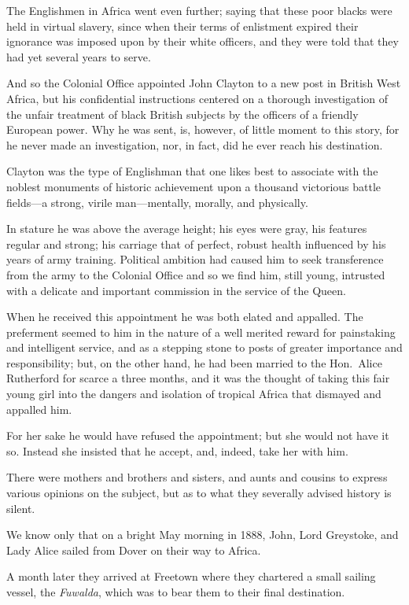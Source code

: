 The Englishmen in Africa went even further; saying that these poor blacks were held in virtual slavery, since when their terms of enlistment expired their ignorance was imposed upon by their white officers, and they were told that they had yet several years to serve.

And so the Colonial Office appointed John Clayton to a new post in British West Africa, but his confidential instructions centered on a thorough investigation of the unfair treatment of black British subjects by the officers of a friendly European power. Why he was sent, is, however, of little moment to this story, for he never made an investigation, nor, in fact, did he ever reach his destination.

Clayton was the type of Englishman that one likes best to associate with the noblest monuments of historic achievement upon a thousand victorious battle fields—a strong, virile man—mentally, morally, and physically.

In stature he was above the average height; his eyes were gray, his features regular and strong; his carriage that of perfect, robust health influenced by his years of army training. Political ambition had caused him to seek transference from the army to the Colonial Office and so we find him, still young, intrusted with a delicate and important commission in the service of the Queen.

When he received this appointment he was both elated and appalled. The preferment seemed to him in the nature of a well merited reward for painstaking and intelligent service, and as a stepping stone to posts of greater importance and responsibility; but, on the other hand, he had been married to the Hon.\ Alice Rutherford for scarce a three months, and it was the thought of taking this fair young girl into the dangers and isolation of tropical Africa that dismayed and appalled him.

For her sake he would have refused the appointment; but she would not have it so. Instead she insisted that he accept, and, indeed, take her with him.

There were mothers and brothers and sisters, and aunts and cousins to express various opinions on the subject, but as to what they severally advised history is silent.

We know only that on a bright May morning in 1888, John, Lord Greystoke, and Lady Alice sailed from Dover on their way to Africa.

A month later they arrived at Freetown where they chartered a small sailing vessel, the \emph{Fuwalda}, which was to bear them to their final destination.

